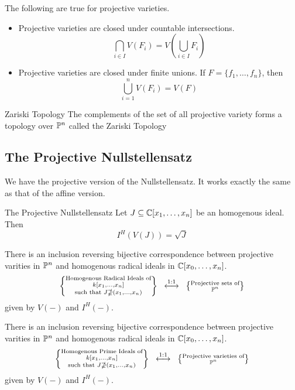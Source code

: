 \documentclass[a4paper]{article}
\begin{document}
\begin{prp}{}{} The following are true for projective varieties. 
\begin{itemize}
\item Projective varieties are closed under countable intersections. $$\bigcap_{i\in I}V(F_i)=V\left(\bigcup_{i\in I}F_i\right)$$
\item Projective varieties are closed under finite unions. If $F=\{f_1,\dots,f_n\}$, then $$\bigcup_{i=1}^nV(F_i)=V(F)$$
\end{itemize}
\end{prp}

\begin{crl}{Zariski Topology}{} The complements of the set of all projective variety forms a topology over $\mathbb{P}^n$ called the Zariski Topology
\end{crl}

\subsection{The Projective Nullstellensatz}
We have the projective version of the Nullstellensatz. It works exactly the same as that of the affine version. 

\begin{thm}{The Projective Nullstellensatz}{} Let $J\subseteq\mathbb{C}[x_1,\dots,x_n]$ be an homogenous ideal. Then $$I^H(V(J))=\sqrt{J}$$
\end{thm}

\begin{crl}{}{} There is an inclusion reversing bijective correspondence between projective varities in $\mathbb{P}^n$ and homogenous radical ideals in $\mathbb{C}[x_0,\dots,x_n]$. $$\left\{\substack{\text{Homogenous Radical Ideals of}\\ k[x_1,\dots,x_n]\\\text{such that }J\nsupseteq(x_1,\dots,x_n)}\right\}\;\;\overset{\text{1:1}}{\longleftrightarrow}\;\;\left\{\substack{\text{Projective sets of}\\ \mathbb{P}^n}\right\}$$ given by $V(-)$ and $I^H(-)$. 
\end{crl}

\begin{crl}{}{} There is an inclusion reversing bijective correspondence between projective varities in $\mathbb{P}^n$ and homogenous radical ideals in $\mathbb{C}[x_0,\dots,x_n]$. $$\left\{\substack{\text{Homogenous Prime Ideals of}\\ k[x_1,\dots,x_n]\\\text{such that }J\nsupseteq(x_1,\dots,x_n)}\right\}\;\;\overset{\text{1:1}}{\longleftrightarrow}\;\;\left\{\substack{\text{Projective varieties of}\\ \mathbb{P}^n}\right\}$$ given by $V(-)$ and $I^H(-)$. 
\end{crl}
\end{document}
